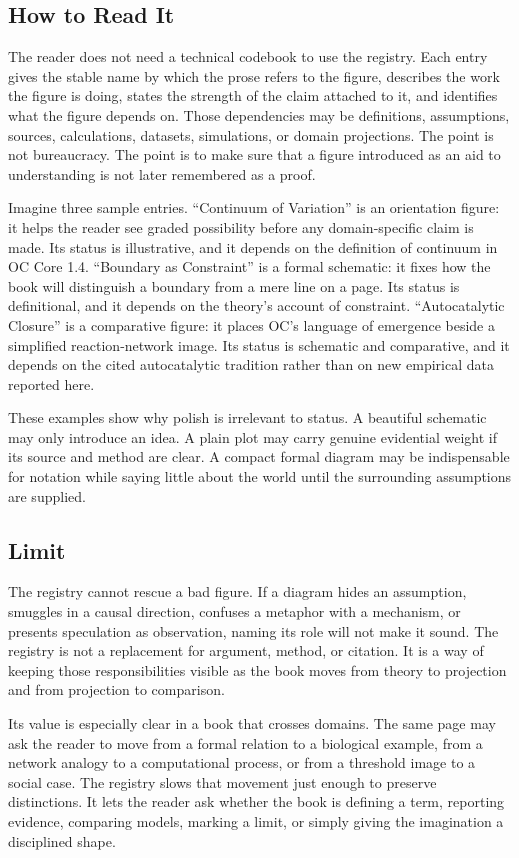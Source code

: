 \documentclass[11pt,a4paper,openany]{book}
\begin{document}
\subsection{How to Read It}
The reader does not need a technical codebook to use the registry. Each entry gives the stable name by which the prose refers to the figure, describes the work the figure is doing, states the strength of the claim attached to it, and identifies what the figure depends on. Those dependencies may be definitions, assumptions, sources, calculations, datasets, simulations, or domain projections. The point is not bureaucracy. The point is to make sure that a figure introduced as an aid to understanding is not later remembered as a proof. \cite{kauffman_autocatalytic,raf_networks}\par
Imagine three sample entries. ``Continuum of Variation'' is an orientation figure: it helps the reader see graded possibility before any domain-specific claim is made. Its status is illustrative, and it depends on the definition of continuum in OC Core 1.4. ``Boundary as Constraint'' is a formal schematic: it fixes how the book will distinguish a boundary from a mere line on a page. Its status is definitional, and it depends on the theory's account of constraint. ``Autocatalytic Closure'' is a comparative figure: it places OC's language of emergence beside a simplified reaction-network image. Its status is schematic and comparative, and it depends on the cited autocatalytic tradition rather than on new empirical data reported here.\par
These examples show why polish is irrelevant to status. A beautiful schematic may only introduce an idea. A plain plot may carry genuine evidential weight if its source and method are clear. A compact formal diagram may be indispensable for notation while saying little about the world until the surrounding assumptions are supplied.\par
\subsection{Limit}
The registry cannot rescue a bad figure. If a diagram hides an assumption, smuggles in a causal direction, confuses a metaphor with a mechanism, or presents speculation as observation, naming its role will not make it sound. The registry is not a replacement for argument, method, or citation. It is a way of keeping those responsibilities visible as the book moves from theory to projection and from projection to comparison. \cite{kauffman_autocatalytic,raf_networks}\par
Its value is especially clear in a book that crosses domains. The same page may ask the reader to move from a formal relation to a biological example, from a network analogy to a computational process, or from a threshold image to a social case. The registry slows that movement just enough to preserve distinctions. It lets the reader ask whether the book is defining a term, reporting evidence, comparing models, marking a limit, or simply giving the imagination a disciplined shape.\par
\end{document}
